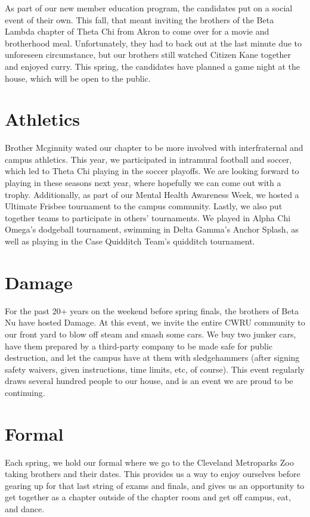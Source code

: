     As part of our new member education program, the candidates put on a social event of their own. This fall, that meant inviting the brothers of the Beta Lambda chapter of Theta Chi from Akron to come over for a movie and brotherhood meal. Unfortunately, they had to back out at the last minute due to unforeseen circumstance, but our brothers still watched Citizen Kane together and enjoyed curry. This spring, the candidates have planned a game night at the house, which will be open to the public.
    
  \section*{Athletics}
    
    Brother Mcginnity wated our chapter to be more involved with interfraternal and campus athletics. This year, we participated in intramural football and soccer, which led to Theta Chi playing in the soccer playoffs. We are looking forward to playing in these seasons next year, where hopefully we can come out with a trophy. Additionally, as part of our Mental Health Awareness Week, we hosted a Ultimate Frisbee tournament to the campus community. Lastly, we also put together teams to participate in others' tournaments. We played in Alpha Chi Omega's dodgeball tournament, swimming in Delta Gamma’s Anchor Splash, as well as playing in the Case Quidditch Team's quidditch tournament.
    
  \section*{Damage}
  
    For the past 20+ years on the weekend before spring finals, the brothers of Beta Nu have hosted Damage. At this event, we invite the entire CWRU community to our front yard to blow off steam and smash some cars. We buy two junker cars, have them prepared by a third-party company to be made safe for public destruction, and let the campus have at them with sledgehammers (after signing safety waivers, given instructions, time limits, etc, of course). This event regularly draws several hundred people to our house, and is an event we are proud to be continuing.
    
  \section*{Formal}
  
    Each spring, we hold our formal where we go to the Cleveland Metroparks Zoo taking brothers and their dates. This provides us a way to enjoy ourselves before gearing up for that last string of exams and finals, and gives us an opportunity to get together as a chapter outside of the chapter room and get off campus, eat, and dance.
    
